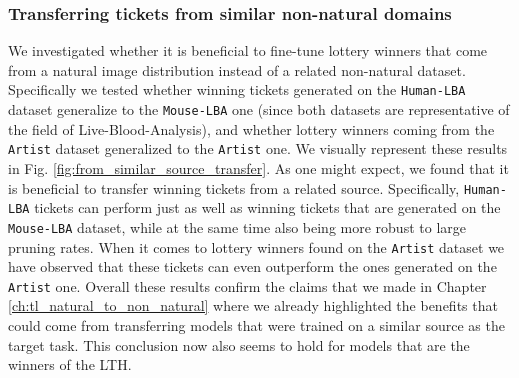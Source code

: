 

\subsubsection{Transferring tickets from similar non-natural domains}
We investigated whether it is beneficial to fine-tune lottery winners that come from a natural image distribution instead of a related non-natural dataset. Specifically we tested whether winning tickets generated on the \texttt{Human-LBA} dataset generalize to the \texttt{Mouse-LBA} one (since both datasets are representative of the field of Live-Blood-Analysis), and whether lottery winners coming from the \texttt{Artist}  dataset generalized to the \texttt{Artist}  one. We visually represent these results in Fig. \ref{fig:from_similar_source_transfer}. As one might expect, we found that it is beneficial to transfer winning tickets from a related source. Specifically, \texttt{Human-LBA} tickets can perform just as well as winning tickets that are generated on the \texttt{Mouse-LBA} dataset, while at the same time also being more robust to large pruning rates. When it comes to lottery winners found on the \texttt{Artist}  dataset we have observed that these tickets can even outperform the ones generated on the \texttt{Artist}  one. Overall these results confirm the claims that we made in Chapter \ref{ch:tl_natural_to_non_natural} where we already highlighted the benefits that could come from transferring models that were trained on a similar source as the target task. This conclusion now also seems to hold for models that are the winners of the LTH. 




